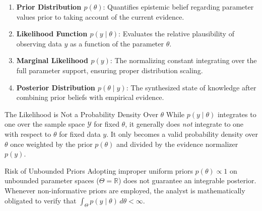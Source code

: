 \begin{enumerate}
  \item \textbf{Prior Distribution \(p(\theta)\)}: Quantifies epistemic belief regarding parameter values prior to taking account of the current evidence.
  \item \textbf{Likelihood Function \(p(y \mid \theta)\)}: Evaluates the relative plausibility of observing data \(y\) as a function of the parameter \(\theta\).
  \item \textbf{Marginal Likelihood \(p(y)\)}: The normalizing constant integrating over the full parameter support, ensuring proper distribution scaling.
  \item \textbf{Posterior Distribution \(p(\theta \mid y)\)}: The synthesized state of knowledge after combining prior beliefs with empirical evidence.
\end{enumerate}

\begin{InsightBox}{The Likelihood is Not a Probability Density Over \(\theta\)}
  While \(p(y \mid \theta)\) integrates to one over the sample space \(\mathcal{Y}\) for fixed \(\theta\), it generally does \emph{not} integrate to one with respect to \(\theta\) for fixed data \(y\). It only becomes a valid probability density over \(\theta\) once weighted by the prior \(p(\theta)\) and divided by the evidence normalizer \(p(y)\).
\end{InsightBox}

\begin{WarningBox}{Risk of Unbounded Priors}
  Adopting improper uniform priors \(p(\theta) \propto 1\) on unbounded parameter spaces (\(\Theta = \mathbb{R}\)) does not guarantee an integrable posterior. Whenever non-informative priors are employed, the analyst is mathematically obligated to verify that \(\int_\Theta p(y \mid \theta) \, d\theta < \infty\).
\end{WarningBox}
